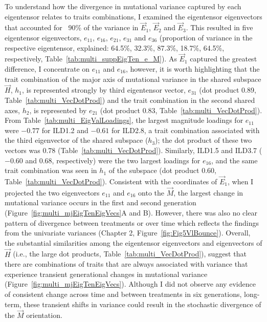 To understand how the divergence in mutational variance captured by each eigentensor relates to traits combinations, I examined the eigentensor eigenvectors that accounted for ~90\% of the variance in $\vec{E}_1$, $\vec{E}_2$ and $\vec{E}_3$. This resulted in five eigentensor eigenvectors, $e_{11}$, $e_{16}$, $e_{21}$, $e_{31}$ and $e_{36}$ (proportion of variance in the respective eigentensor, explained: 64.5\%, 32.3\%, 87.3\%, 18.7\%, 64.5\%, respectively, Table~\ref{tab:multi_suppEigTen_e_M}). As $\vec{E}_1$ captured the greatest difference, I concentrate on $e_{11}$ and $e_{16}$, however, it is worth highlighting that the trait combination of the major axis of mutational variance in the shared subspace $\vec{H}$, $h_1$, is represented strongly by third eigentensor vector, $e_{31}$ (dot product 0.89, Table~\ref{tab:multi_VecDotProd}) and the trait combination in the second shared axes, $h_2$, is represented by $e_{21}$ (dot product $0.83$, Table~\ref{tab:multi_VecDotProd}). From Table~\ref{tab:multi_EigValLoadings}, the largest magnitude loadings for $e_{11}$ were $-0.77$ for ILD1.2 and $-0.61$ for ILD2.8, a trait combination associated with the third eigenvector of the shared subspace ($h_3$); the dot product of these two vectors was 0.78 (Table~\ref{tab:multi_VecDotProd}). Similarly, ILD1.5 and ILD3.7 ($-0.60$ and 0.68, respectively) were the two largest loadings for $e_{16}$, and the same trait combination was seen in $h_1$ of the subspace (dot product 0.60, Table~\ref{tab:multi_VecDotProd}). Consistent with the coordinates of $\vec{E}_1$, when I projected the two eigenvectors $e_{11}$ and $e_{16}$ onto the $\vec{M}$, the largest change in mutational variance occurs in the first and second generation (Figure~\ref{fig:multi_mjEigTenEigVecs}A and B). However, there was also no clear pattern of divergence between treatments or over time which reflects the findings from the univariate variances (Chapter 2, Figure~\ref{fig:Fig5VlBounce}). Overall, the substantial similarities among the eigentensor eigenvectors and eigenvectors of $\vec{H}$ (i.e., the large dot products, Table~\ref{tab:multi_VecDotProd}), suggest that there are combinations of traits that are always associated with variance that experience transient generational changes in mutational variance (Figure~\ref{fig:multi_mjEigTenEigVecs}). Although I did not observe any evidence of consistent change across time and between treatments in six generations, long-term, these transient shifts in variance could result in the stochastic divergence of the $\vec{M}$ orientation. \par

